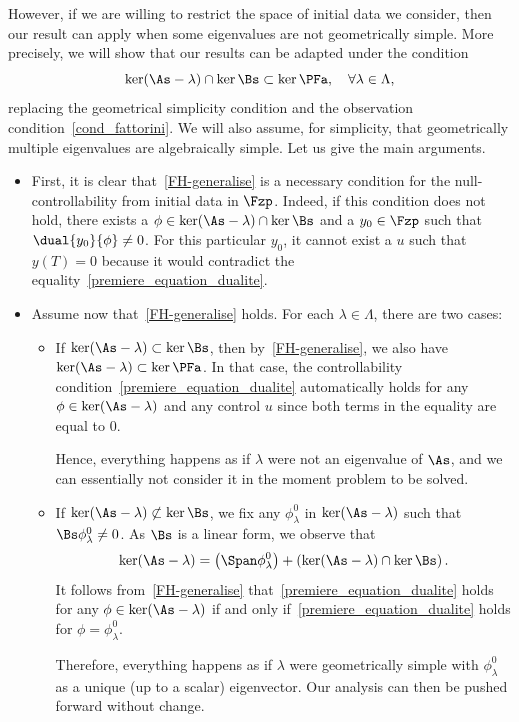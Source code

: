 However, if we are willing to restrict the space of initial data we consider, then our result can apply when some eigenvalues are not geometrically simple. More precisely, we will show that our results can be adapted under the condition
\begin{equation}\label{FH-generalise}
\ker(\As-\lambda) \cap \ker \Bs \subset \ker \PFa, \quad \forall \lambda \in \Lambda,
\end{equation}
replacing the geometrical simplicity condition and the observation condition~\eqref{cond_fattorini}. We will also assume, for simplicity, that geometrically multiple eigenvalues are algebraically simple. Let us give the main arguments.
\begin{itemize}
\item First, it is clear that~\eqref{FH-generalise} is a necessary condition for the null-controllability from initial data in $\Fzp$. Indeed, if this condition does not hold, there exists a $\phi\in \ker(\As-\lambda) \cap \ker \Bs$ and a $y_0\in \Fzp$ such that $\dual{y_0}{\phi}\neq 0$. For this particular $y_0$, it cannot exist a $u$ such that $y(T)=0$ because it would contradict the equality~\eqref{premiere_equation_dualite}.
\item Assume now that~\eqref{FH-generalise} holds. For each $\lambda\in \Lambda$, there are two cases:
\begin{itemize}
\item If $\ker(\As-\lambda)\subset \ker \Bs$, then by~\eqref{FH-generalise}, we also have $\ker(\As-\lambda)\subset \ker \PFa$. In that case, the controllability condition~\eqref{premiere_equation_dualite} automatically holds for any $\phi\in \ker(\As-\lambda)$ and any control $u$ since both terms in the equality are equal to $0$.

Hence, everything happens as if $\lambda$ were not an eigenvalue of $\As$, and we can essentially not consider it in the moment problem to be solved.
\item If $\ker(\As-\lambda)\not\subset \ker \Bs$, we fix any $\phi_\lambda^0$ in $\ker(\As-\lambda)$ such that $\Bs \phi_\lambda^0\neq 0$. As $\Bs$ is a linear form, we observe that
\[
\ker(\As-\lambda) = \left(\Span \phi_\lambda^0\right) + \left(\ker(\As-\lambda)\cap \ker \Bs\right).
\]
It follows from~\eqref{FH-generalise} that~\eqref{premiere_equation_dualite} holds for any $\phi\in \ker(\As-\lambda)$ if and only if~\eqref{premiere_equation_dualite} holds for $\phi=\phi_\lambda^0$.

Therefore, everything happens as if $\lambda$ were geometrically simple with $\phi_\lambda^0$ as a unique (up to a scalar) eigenvector. Our analysis can then be pushed forward without change.
\end{itemize}
\end{itemize}



